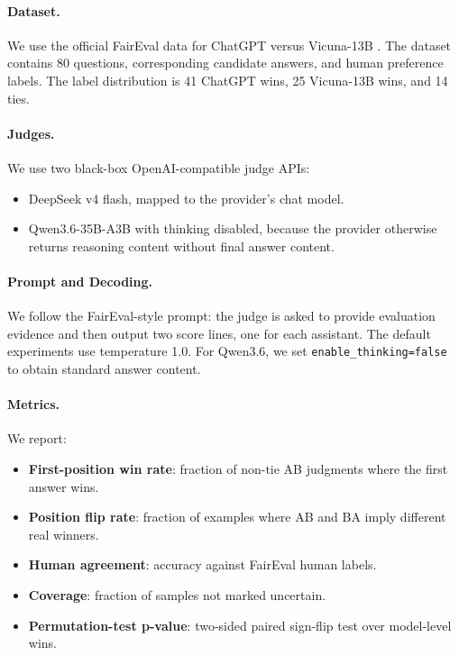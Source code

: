 \documentclass[11pt]{article}
\begin{document}
\paragraph{Dataset.}
We use the official FairEval data for ChatGPT versus Vicuna-13B \cite{wang2024faireval,chiang2023vicuna}. The dataset contains 80 questions, corresponding candidate answers, and human preference labels. The label distribution is 41 ChatGPT wins, 25 Vicuna-13B wins, and 14 ties.

\paragraph{Judges.}
We use two black-box OpenAI-compatible judge APIs:
\begin{itemize}
    \item DeepSeek v4 flash, mapped to the provider's chat model.
    \item Qwen3.6-35B-A3B with thinking disabled, because the provider otherwise returns reasoning content without final answer content.
\end{itemize}

\paragraph{Prompt and Decoding.}
We follow the FairEval-style prompt: the judge is asked to provide evaluation evidence and then output two score lines, one for each assistant. The default experiments use temperature 1.0. For Qwen3.6, we set \texttt{enable\_thinking=false} to obtain standard answer content.

\paragraph{Metrics.}
We report:
\begin{itemize}
    \item \textbf{First-position win rate}: fraction of non-tie AB judgments where the first answer wins.
    \item \textbf{Position flip rate}: fraction of examples where AB and BA imply different real winners.
    \item \textbf{Human agreement}: accuracy against FairEval human labels.
    \item \textbf{Coverage}: fraction of samples not marked uncertain.
    \item \textbf{Permutation-test p-value}: two-sided paired sign-flip test over model-level wins.
\end{itemize}
\end{document}
